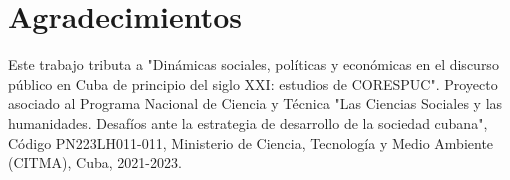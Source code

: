 \documentclass[a4paper,11pt,twocolumn,twoside]{article}
\begin{document}
\section*{Agradecimientos}

Este trabajo tributa a "Dinámicas sociales, políticas y económicas en el discurso público 
en Cuba de principio del siglo XXI: estudios de CORESPUC". Proyecto 
asociado al Programa Nacional de Ciencia y Técnica "Las Ciencias Sociales y las humanidades. 
Desafíos ante la estrategia de desarrollo de la sociedad cubana", Código PN223LH011-011, Ministerio
de Ciencia, Tecnología y Medio Ambiente (CITMA), Cuba, 2021-2023.



\end{document}
